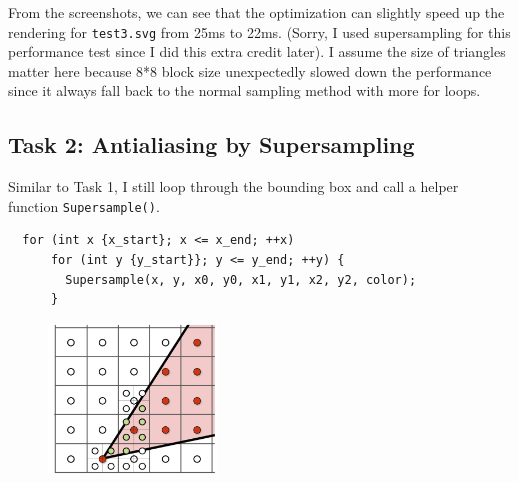 \documentclass[11pt]{article}
\begin{document}
From the screenshots, we can see that the optimization can slightly speed up the rendering
for \texttt{test3.svg} from 25ms to 22ms. (Sorry, I used supersampling for this performance test since
I did this extra credit later). I assume the size of triangles matter here because
8*8 block size unexpectedly slowed down the performance since it always fall back to the normal sampling
method with more for loops.
\newpage
\subsection*{Task 2: Antialiasing by Supersampling}
Similar to Task 1, I still loop through the bounding box and call a helper function
\texttt{Supersample()}.
\begin{verbatim}    
  for (int x {x_start}; x <= x_end; ++x)
      for (int y {y_start}}; y <= y_end; ++y) {
        Supersample(x, y, x0, y0, x1, y1, x2, y2, color);
      }
\end{verbatim}

\begin{figure}[h]
    \centering
    \includegraphics[width=0.40\textwidth]{T2r.png}
    \caption{} %
  \end{figure}
\end{document}
